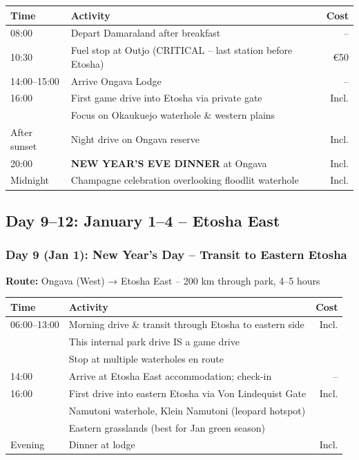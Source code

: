 \documentclass[11pt]{article}
\begin{document}
\begin{tabular}{llr}
\toprule
\textbf{Time} & \textbf{Activity} & \textbf{Cost} \\
\midrule
08:00 & Depart Damaraland after breakfast & -- \\
10:30 & Fuel stop at Outjo (CRITICAL -- last station before Etosha) & €50 \\
14:00--15:00 & Arrive Ongava Lodge & -- \\
16:00 & First game drive into Etosha via private gate & Incl. \\
& Focus on Okaukuejo waterhole \& western plains & \\
After sunset & Night drive on Ongava reserve & Incl. \\
20:00 & \textbf{NEW YEAR'S EVE DINNER} at Ongava & Incl. \\
Midnight & Champagne celebration overlooking floodlit waterhole & Incl. \\
\bottomrule
\end{tabular}

\clearpage
\subsection{Day 9--12: January 1--4 -- Etosha East}

\subsubsection{Day 9 (Jan 1): New Year's Day -- Transit to Eastern Etosha}

\textbf{Route:} Ongava (West) → Etosha East -- 200 km through park, 4--5 hours

\begin{tabular}{llr}
\toprule
\textbf{Time} & \textbf{Activity} & \textbf{Cost} \\
\midrule
06:00--13:00 & Morning drive \& transit through Etosha to eastern side & Incl. \\
& This internal park drive IS a game drive & \\
& Stop at multiple waterholes en route & \\
14:00 & Arrive at Etosha East accommodation; check-in & -- \\
16:00 & First drive into eastern Etosha via Von Lindequist Gate & Incl. \\
& Namutoni waterhole, Klein Namutoni (leopard hotspot) & \\
& Eastern grasslands (best for Jan green season) & \\
Evening & Dinner at lodge & Incl. \\
\bottomrule
\end{tabular}
\end{document}
